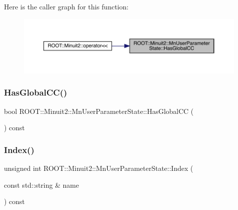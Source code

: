Here is the caller graph for this function\+:\nopagebreak
\begin{figure}[H]
\begin{center}
\leavevmode
\includegraphics[width=350pt]{d3/de0/classROOT_1_1Minuit2_1_1MnUserParameterState_aca4004d4a59d41f32f6031b55c0088db_icgraph}
\end{center}
\end{figure}
\mbox{\label{classROOT_1_1Minuit2_1_1MnUserParameterState_aca4004d4a59d41f32f6031b55c0088db}} 
\subsubsection{\texorpdfstring{HasGlobalCC()}{HasGlobalCC()}\hspace{0.1cm}{\footnotesize\ttfamily [2/2]}}
{\footnotesize\ttfamily bool R\+O\+O\+T\+::\+Minuit2\+::\+Mn\+User\+Parameter\+State\+::\+Has\+Global\+CC (\begin{DoxyParamCaption}{ }\end{DoxyParamCaption}) const\hspace{0.3cm}{\ttfamily [inline]}}

\mbox{\label{classROOT_1_1Minuit2_1_1MnUserParameterState_a2301d51ec17effc44792821d4482cb14}} 
\subsubsection{\texorpdfstring{Index()}{Index()}\hspace{0.1cm}{\footnotesize\ttfamily [1/2]}}
{\footnotesize\ttfamily unsigned int R\+O\+O\+T\+::\+Minuit2\+::\+Mn\+User\+Parameter\+State\+::\+Index (\begin{DoxyParamCaption}\item[{const std\+::string \&}]{name }\end{DoxyParamCaption}) const}

